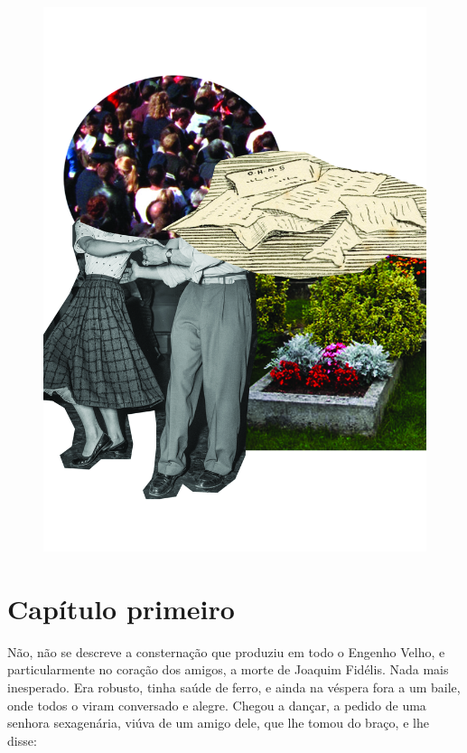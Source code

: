 \pagebreak
\thispagestyle{empty}
\begin{figure}
\vspace*{-.5cm}
\hspace*{-2.3cm}\includegraphics[width=140mm]{../ilustracoes/07_GALERIA.jpg}
\end{figure}
\pagebreak


\section{Capítulo primeiro}

Não, não se descreve a consternação que produziu em todo o Engenho
Velho, e particularmente no coração dos amigos, a morte de Joaquim
Fidélis. Nada mais inesperado. Era robusto, tinha saúde de ferro, e
ainda na véspera fora a um baile, onde todos o viram conversado e
alegre. Chegou a dançar, a pedido de uma senhora sexagenária, viúva de
um amigo dele, que lhe tomou do braço, e lhe disse:

